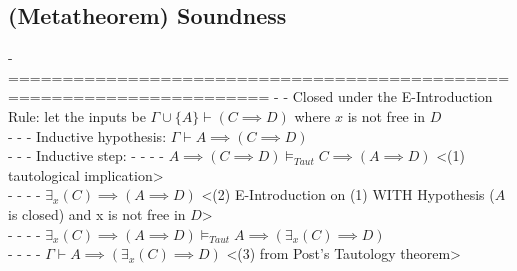 \documentclass{article}
\begin{document}
\subsection{(Metatheorem) Soundness}
	- 
	======================================================================
		- - Closed under the E-Introduction Rule: let the inputs be $\Gamma \cup \{A\} \vdash (C \implies D)$ where $x$ is not free in $D$ \\
			- - - Inductive hypothesis: $\Gamma \vdash A \implies (C \implies D)$ \\
			- - - Inductive step:
				- - - - $A \implies (C \implies D) \vDash_{Taut} C \implies (A \implies D)$ <(1) tautological implication> \\
				- - - - $\exists_x(C) \implies (A \implies D)$ <(2) E-Introduction on (1) WITH Hypothesis ($A$ is closed) and x is not free in $D$> \\
				- - - - $\exists_x(C) \implies (A \implies D) \vDash_{Taut} A \implies (\exists_x(C) \implies D)$ \\
				- - - - $\Gamma \vdash A \implies (\exists_x(C) \implies D)$ <(3) from Post's Tautology theorem> \\
\begin{comment}
\subsection{() }
	- 
	======================================================================

Hotkeys:
Ctrl+R
Ctrl+K, Ctrl+1
Ctrl+K, Ctrl+J
Ctrl+Shift+[
Ctrl+Shift+[

TODO:
- = vs \equiv metaproofs
- Arity bf ArityR
- TODO REREAD STUFF AFTER DEFINITIONS ARE DONE, SKIPPED A LOT
- fix hypothesis referencing - WITH Hypothesis (SOMETHING)
- fix \vdash \vDash writing metaproofs - consistency
- use cantor product + sequences instead kleene star 
- closed terms are important in semantics ?? review dis
\end{comment}
\end{document}
